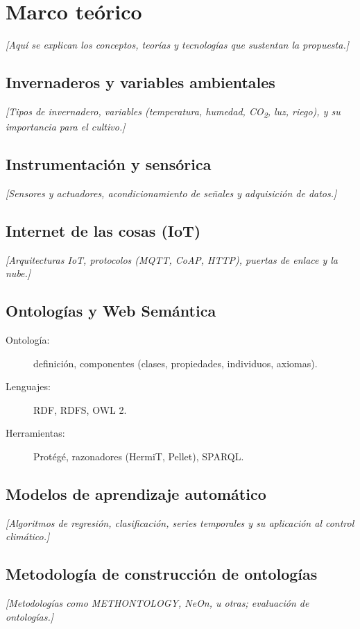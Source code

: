 
\chapter{Marco teórico}
\label{cap:marco-teorico}

\textit{[Aquí se explican los conceptos, teorías y tecnologías que sustentan la propuesta.]}

\section{Invernaderos y variables ambientales}
\label{sec:invernaderos}

\textit{[Tipos de invernadero, variables (temperatura, humedad, CO\textsubscript{2}, luz,
riego), y su importancia para el cultivo.]}

\section{Instrumentación y sensórica}
\label{sec:sensorica}

\textit{[Sensores y actuadores, acondicionamiento de señales y adquisición de datos.]}

\section{Internet de las cosas (IoT)}
\label{sec:iot}

\textit{[Arquitecturas IoT, protocolos (MQTT, CoAP, HTTP), puertas de enlace y la nube.]}

\section{Ontologías y Web Semántica}
\label{sec:web-semantica}

\begin{description}
    \item[Ontología:] definición, componentes (clases, propiedades, individuos, axiomas).
    \item[Lenguajes:] RDF, RDFS, OWL 2.
    \item[Herramientas:] Protégé, razonadores (HermiT, Pellet), SPARQL.
\end{description}

\section{Modelos de aprendizaje automático}
\label{sec:ml}

\textit{[Algoritmos de regresión, clasificación, series temporales y su aplicación al
control climático.]}

\section{Metodología de construcción de ontologías}
\label{sec:metodologias-ontologia}

\textit{[Metodologías como METHONTOLOGY, NeOn, u otras; evaluación de ontologías.]}
